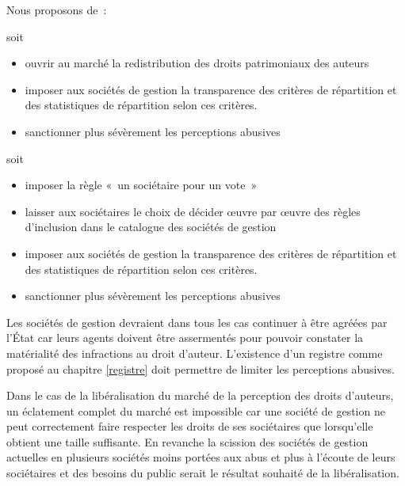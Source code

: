 \begin{mesure}
Nous proposons de~:

\begin{description}
\item soit
	\begin{itemize}
	\item ouvrir au marché la redistribution des droits patrimoniaux des auteurs
	\item imposer aux sociétés de gestion la transparence des critères de répartition et des statistiques de répartition selon ces critères.
	\item sanctionner plus sévèrement les perceptions abusives
	\end{itemize}

\item soit 
	\begin{itemize}
	\item imposer la règle «~un sociétaire pour un vote~»
	\item laisser aux sociétaires le choix de décider œuvre par œuvre des règles d'inclusion dans le catalogue des sociétés de gestion
	\item imposer aux sociétés de gestion la transparence des critères de répartition et des statistiques de répartition selon ces critères.
	\item sanctionner plus sévèrement les perceptions abusives
	\end{itemize}
\end{description}
\end{mesure}

Les sociétés de gestion devraient dans tous les cas continuer à être agréées par l'État car leurs agents doivent être assermentés pour pouvoir constater la matérialité des infractions au droit d'auteur. L'existence d'un registre comme proposé au chapitre \ref{registre} doit permettre de limiter les perceptions abusives.

Dans le cas de la libéralisation du marché de la perception des droits d'auteurs, un éclatement complet du marché est impossible car une société de gestion ne peut correctement faire respecter les droits de ses sociétaires que lorsqu'elle obtient une taille suffisante. En revanche la scission des sociétés de gestion actuelles en plusieurs sociétés moins portées aux abus et plus à l'écoute de leurs sociétaires et des besoins du public serait le résultat souhaité de la libéralisation.

